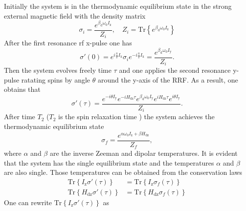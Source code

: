 \documentclass[review]{elsarticle}
\begin{document}
Initially the system is in the thermodynamic equilibrium state in the strong external magnetic field with the density matrix
%
\begin{equation}
    \label{eq:a1}
   \sigma_{i} = \dfrac{e^{\beta_\mathrm{d} \omega_{0} I_\mathrm{z}}}{Z_{i}} ,
   \quad
   Z_{i} = \mathrm{Tr}\left\{e^{\beta_\mathrm{d} \omega_{0} I_\mathrm{z}} \right\}
\end{equation}
%
After the first resonance rf x-pulse one has
%
\begin{equation}
    \label{eq:a2}
    \sigma'(0) = e^{ i \frac \pi 2 I_\mathrm{x}}
    \sigma_{i}
    e^{-i \frac \pi 2 I_\mathrm{x}}
    = \dfrac{e^{\beta_\mathrm{d} \omega_{0} I_\mathrm{y}}}{Z_{i}}  .
\end{equation}
%
Then the system evolves freely time $\tau$ 
and one applies the second resonance y-pulse ratating spins by angle $\theta$ around the y-axis of the RRF.
As a result, one obtains that
\begin{equation}
    \label{eq:a3}
    \sigma'(\tau) 
    = \dfrac{
      e^{-i \theta I_\mathrm{y}} e^{-i H_\mathrm{dz} \tau} 
      e^{\beta_\mathrm{d} \omega_{0} I_\mathrm{y}}
      e^{i H_\mathrm{dz} \tau} e^{i \theta I_\mathrm{y}}
    }{Z_{i}}. 
\end{equation}
%
After time $T_2$ ($T_2$ is the spin relaxation time \cite{Goldman_1970}) the system achieves the thermodynamic equilibrium state
\begin{equation}
    \label{eq:a4}
    \sigma_{f} 
    = \dfrac{ e^{\alpha \omega_{0} I_\mathrm{z} + \beta H_\mathrm{dz}} }{Z_f},
\end{equation}
%
where $\alpha$ and $\beta$ are the inverse Zeeman and dipolar temperatures.
It is evident that the system has the single equilibrium state 
and the temperatures $\alpha$ and $\beta$ are also single.
Those temperatures can be obtained from the conservation laws
\begin{align}
    \label{eq:a5}
    \mathrm{Tr} \left\{ I_\mathrm{z} \sigma'(\tau) \right\}
    & = \mathrm{Tr} \left\{ I_\mathrm{z} \sigma_{f}(\tau) \right\}
    \\
    \label{eq:a6}
    \mathrm{Tr} \left\{ H_\mathrm{dz} \sigma'(\tau) \right\}
    & = \mathrm{Tr} \left\{ H_\mathrm{dz} \sigma_{f}(\tau) \right\}
\end{align}
%
One can rewrite $\mathrm{Tr} \left\{ I_\mathrm{z} \sigma'(\tau) \right\}$ as 
%
\end{document}
